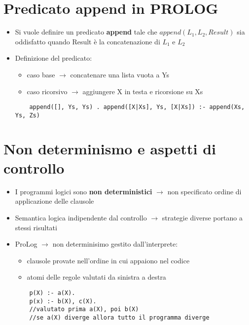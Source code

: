 \documentclass[12pt]{extarticle}
\begin{document}
\section*{Predicato append in PROLOG}
\begin{itemize}
  \item Si vuole definire un predicato \textbf{append} tale che $append(L_1, L_2, Result)$ sia oddisfatto quando Result è la concatenazione
        di $L_1$ e $L_2$
  \item Definizione del predicato:
   \begin{itemize}
    \item caso base $\rightarrow$ concatenare una lista vuota a Ys
    \item caso ricorsivo $\rightarrow$ aggiungere X in testa e ricorsione su Xs
  \end{itemize}
  \begin{lstlisting}
    append([], Ys, Ys) . append([X|Xs], Ys, [X|Xs]) :- append(Xs, Ys, Zs)
  \end{lstlisting}
 \end{itemize}

 \newpage

 \section*{Non determinismo e aspetti di controllo}
\begin{itemize}
  \item I programmi logici sono \textbf{non deterministici} $\rightarrow$ non specificato ordine di applicazione delle 
        clausole
  \item Semantica logica indipendente dal controllo $\rightarrow$ strategie diverse portano a stessi risultati
  \item ProLog $\rightarrow$ non determinisimo gestito dall'interprete:
  \begin{itemize}
    \item clausole provate nell'ordine in cui appaiono nel codice
    \item atomi delle regole valutati da sinistra a destra
  \end{itemize}
  \begin{lstlisting}
    p(X) :- a(X).
    p(x) :- b(X), c(X).
    //valutato prima a(X), poi b(X)
    //se a(X) diverge allora tutto il programma diverge
  \end{lstlisting}
\end{itemize}
\end{document}
